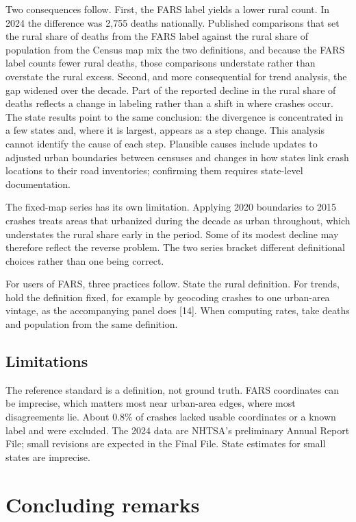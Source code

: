 \documentclass[12pt]{article}
\begin{document}
Two consequences follow. First, the FARS label yields a lower rural count. In 2024 the difference was 2{,}755 deaths nationally. Published comparisons that set the rural share of deaths from the FARS label against the rural share of population from the Census map mix the two definitions, and because the FARS label counts fewer rural deaths, those comparisons understate rather than overstate the rural excess. Second, and more consequential for trend analysis, the gap widened over the decade. Part of the reported decline in the rural share of deaths reflects a change in labeling rather than a shift in where crashes occur. The state results point to the same conclusion: the divergence is concentrated in a few states and, where it is largest, appears as a step change. This analysis cannot identify the cause of each step. Plausible causes include updates to adjusted urban boundaries between censuses and changes in how states link crash locations to their road inventories; confirming them requires state-level documentation.

The fixed-map series has its own limitation. Applying 2020 boundaries to 2015 crashes treats areas that urbanized during the decade as urban throughout, which understates the rural share early in the period. Some of its modest decline may therefore reflect the reverse problem. The two series bracket different definitional choices rather than one being correct.

For users of FARS, three practices follow. State the rural definition. For trends, hold the definition fixed, for example by geocoding crashes to one urban-area vintage, as the accompanying panel does [14]. When computing rates, take deaths and population from the same definition.

\subsection{Limitations}

The reference standard is a definition, not ground truth. FARS coordinates can be imprecise, which matters most near urban-area edges, where most disagreements lie. About 0.8\% of crashes lacked usable coordinates or a known label and were excluded. The 2024 data are NHTSA's preliminary Annual Report File; small revisions are expected in the Final File. State estimates for small states are imprecise.

\section{Concluding remarks}
\end{document}
